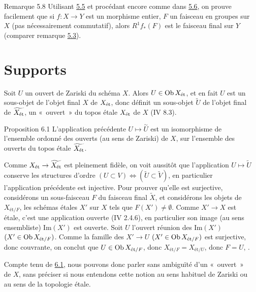 \documentclass[10pt]{../fichiers-configuration-latex/smfart}
\begin{document}
\begin{enonce*}[remark]{Remarque 5.8}
Utilisant \hyperref[VIII.prop5.5]{5.5} et procédant encore comme dans
\hyperref[VIII.cor5.6]{5.6}, on prouve facilement que si $f : X \to Y$ est un
morphisme entier, $F$ un faisceau en groupes sur $X$ (pas
nécessairement commutatif), alors $R^1 f_{\ast} (F)$ est le faisceau
final sur $Y$ (comparer remarque \hyperref[VIII.rem5.3]{5.3}).
\end{enonce*}

\section{Supports}\pageoriginale{}

Soit $U$ un ouvert de Zariski du schéma $X$. Alors $U \in \operatorname{Ob}
X_{\text{\rm ét}}$,
et en fait $U$ est un sous-objet de l'objet final $X$ de $X_{\text{\rm
    ét}}$,
donc définit un sous-objet $\widetilde{U}$ de l'objet final de
$\widetilde{X_{\text{\rm ét}}}$, \ie un « ouvert » du topos
étale $X_{\text{\rm ét}}$
de $X$ (IV 8.3).

\begin{enonce*}{Proposition 6.1}
L'application précédente $U \mapsto \overset{\sim}{U}$ est un
isomorphisme de l'ensemble ordonné des ouverts (au sens de Zariski) de
$X$, sur l'ensemble des ouverts du topos étale
$\widetilde{X_{\text{\rm ét}}}$.
\end{enonce*}

Comme $X_{\text{\rm ét}} \to \widetilde{X_{\text{\rm ét}}}$ est
pleinement fidèle, on
voit aussitôt que l'application $U \mapsto \widetilde{U}$ conserve
les structures d'ordre \ie $(U \subset V) \Leftrightarrow
(\widetilde{U} \subset \widetilde{V})$, en particulier
l'application précédente est injective. Pour prouver qu'elle est
surjective, considérons un sous-faisceau $F$ du faisceau final
$\widetilde{X}$, et considérons les objets de $X_{\text{ét}/ F}$, \ie
les schémas étales $X'$ sur $X$ tels que $F(X') \neq ∅$. Comme
$X' \to X$ est étale, c'est une application ouverte (\EGA IV 2.4.6), en
particulier son image (au sens ensembliste) $\text{Im}(X')$ est
ouverte. Soit $U$ l'ouvert réunion des $\text{Im}(X')$ $(X'\in \operatorname{Ob}
X_{\text{ét} /  F})$. Comme la famille des $X'\to U$ $(X'\in \operatorname{Ob}
X_{\text{ét}/F})$ est
surjective, donc couvrante, on conclut que $U \in \operatorname{Ob} X_{\text{ét}/F}$, donc
$ X_{\text{ét}/F} =  X_{\text{ét}/U}$, donc $F = U$, \cqfd.

Compte tenu de \hyperref[VIII.prop6.1]{6.1}, nous pouvons donc parler sans
ambiguïté d'un « ouvert » de $X$, sans préciser si nous
entendons cette notion au sens habituel de Zariski ou au sens de la
topologie étale.
\end{document}
